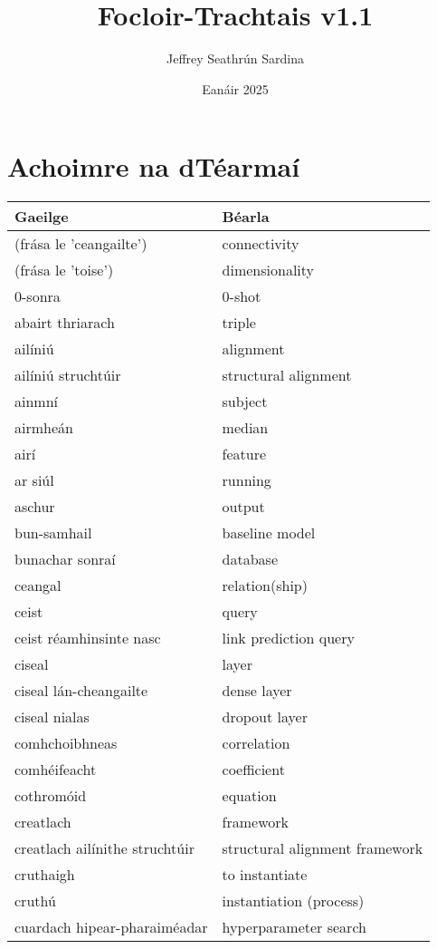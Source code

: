 \documentclass{article}
\title{Focloir-Trachtais v1.1}
\author{Jeffrey Seathrún Sardina}
\date{Eanáir 2025}
\begin{document}
            \maketitle
        
\section{Achoimre na dTéarmaí}\begin{longtable}{|l|l|}
	\hline
		\textbf{Gaeilge} & \textbf{Béarla}\\ \hline 
		(frása le 'ceangailte')&connectivity\\ \hline 
		(frása le 'toise')&dimensionality\\ \hline 
		0-sonra&0-shot\\ \hline 
		abairt thriarach&triple\\ \hline 
		ailíniú&alignment\\ \hline 
		ailíniú struchtúir&structural alignment\\ \hline 
		ainmní&subject\\ \hline 
		airmheán&median\\ \hline 
		airí&feature\\ \hline 
		ar siúl&running\\ \hline 
		aschur&output\\ \hline 
		bun-samhail&baseline model\\ \hline 
		bunachar sonraí&database\\ \hline 
		ceangal&relation(ship)\\ \hline 
		ceist&query\\ \hline 
		ceist réamhinsinte nasc&link prediction query\\ \hline 
		ciseal&layer\\ \hline 
		ciseal lán-cheangailte&dense layer\\ \hline 
		ciseal nialas&dropout layer\\ \hline 
		comhchoibhneas&correlation\\ \hline 
		comhéifeacht&coefficient\\ \hline 
		cothromóid&equation\\ \hline 
		creatlach&framework\\ \hline 
		creatlach ailínithe struchtúir&structural alignment framework\\ \hline 
		cruthaigh&to instantiate\\ \hline 
		cruthú&instantiation (process)\\ \hline 
		cuardach hipear-pharaiméadar&hyperparameter search\\ \hline 

\end{longtable}
\end{document}
